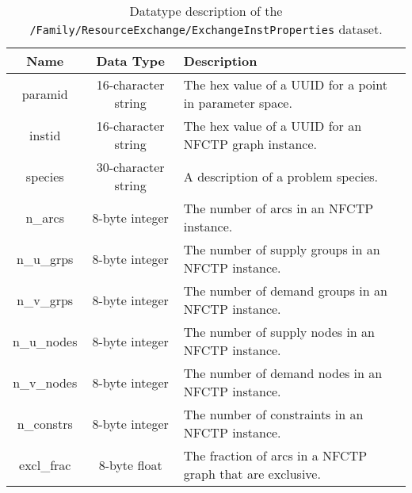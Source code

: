 \begin{table}[h!]
\centering
\label{tbl:/Family/ResourceExchange/ExchangeInstProperties}
\caption{Datatype description of the \lstinline[basicstyle=\ttfamily\color{black}]|/Family/ResourceExchange/ExchangeInstProperties| dataset.}
\begin{tabularx}{\columnwidth-10pt}{|c|c|X|} %
\hline
\textbf{Name} & \textbf{Data Type} & \textbf{Description}       \\ \hline
paramid & 16-character string & The hex value of a UUID for a point in parameter space. \\ \hline
instid & 16-character string & The hex value of a UUID for an NFCTP graph instance. \\ \hline
species & 30-character string & A description of a problem species. \\ \hline
n\_arcs & 8-byte integer & The number of arcs in an NFCTP instance. \\ \hline
n\_u\_grps & 8-byte integer & The number of supply groups in an NFCTP instance. \\ \hline
n\_v\_grps & 8-byte integer & The number of demand groups in an NFCTP instance. \\ \hline
n\_u\_nodes & 8-byte integer & The number of supply nodes in an NFCTP instance. \\ \hline
n\_v\_nodes & 8-byte integer & The number of demand nodes in an NFCTP instance. \\ \hline
n\_constrs & 8-byte integer & The number of constraints in an NFCTP instance. \\ \hline
excl\_frac & 8-byte float & The fraction of arcs in a NFCTP graph that are exclusive. \\ \hline
\end{tabularx}
\end{table}

